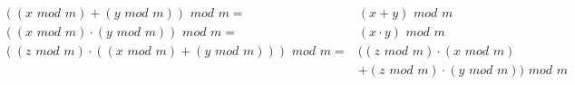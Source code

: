 \begin{align*}
((x \hspace{4pt} mod \hspace{4pt} m) + (y \hspace{4pt} mod \hspace{4pt} m)) \hspace{4pt} mod \hspace{4pt}  m =& (x+y) \hspace{4pt} mod \hspace{4pt} m \\
((x \hspace{4pt} mod \hspace{4pt} m) \cdot (y \hspace{4pt} mod \hspace{4pt} m)) \hspace{4pt} mod \hspace{4pt}  m =& (x \cdot y) \hspace{4pt} mod \hspace{4pt} m \\
((z \hspace{4pt} mod \hspace{4pt} m) \cdot ((x \hspace{4pt} mod \hspace{4pt} m) + (y \hspace{4pt} mod \hspace{4pt} m))) \hspace{4pt} mod \hspace{4pt} m =& ((z \hspace{4pt} mod \hspace{4pt} m) \cdot (x \hspace{4pt} mod \hspace{4pt} m) \\
&+ (z \hspace{4pt} mod \hspace{4pt} m) \cdot (y \hspace{4pt} mod \hspace{4pt} m)) \hspace{4pt} mod \hspace{4pt} m \\ 
\end{align*}

